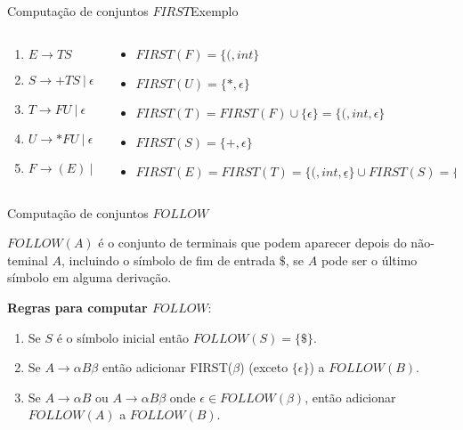 \begin{frame}{Computação de conjuntos $FIRST$}{Exemplo}
    \begin{columns}
        \begin{column}{0.3\textwidth}
            \begin{enumerate}
              \item $E \rightarrow T S$

              \item $S \rightarrow + T S\ |\ \epsilon$

              \item $T \rightarrow F U\ |\ \epsilon$

              \item $U \rightarrow * F U\ |\ \epsilon$

              \item $F \rightarrow ( E )\ |\ int$
            \end{enumerate}
        \end{column}    
        \pause
        \begin{column}{0.7\textwidth}
            \begin{itemize}
                \item $FIRST(F) = \{(, int\}$
                \item $FIRST(U) = \{*, \epsilon\}$
                \item $FIRST(T) = FIRST(F) \cup \{\epsilon\} = \{(, int, \epsilon\}$
                \item $FIRST(S) = \{+, \epsilon\}$
                \item $FIRST(E) =  FIRST(T) = \{(, int, \underline{\epsilon}\} \cup FIRST(S) = \{(, int, +, \epsilon\}$
            \end{itemize}
        \end{column}    
    \end{columns}
\end{frame}

\begin{frame}{Computação de conjuntos $FOLLOW$}

    $FOLLOW(A)$ é o conjunto de terminais que podem aparecer 
depois do não-teminal $A$, incluindo o símbolo de fim de entrada
$\$$, se $A$ pode ser o último símbolo em alguma derivação.\bigskip

{\bf Regras para computar $FOLLOW$}:\medskip

 \begin{enumerate}
    \item Se $S$ é o símbolo inicial então $FOLLOW(S)=\{\$\}$.
    \item Se $A \rightarrow \alpha B\beta$ então adicionar FIRST($\beta$) (exceto $\{\epsilon\}$) a $FOLLOW(B)$.
    \item Se $A \rightarrow \alpha B$ ou $A \rightarrow \alpha B\beta$ onde $\epsilon \in FOLLOW(\beta)$, 
            então adicionar $FOLLOW(A)$ a $FOLLOW(B)$.
 \end{enumerate}

\end{frame}

